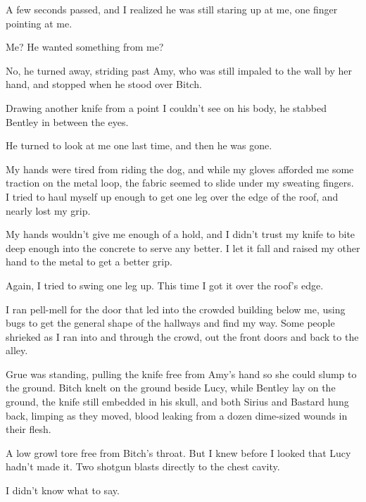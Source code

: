 A few seconds passed, and I realized he was still staring up at me, one finger pointing at me.



Me?  He wanted something from me?



No, he turned away, striding past Amy, who was still impaled to the wall by her hand, and stopped when he stood over Bitch.



Drawing another knife from a point I couldn't see on his body, he stabbed Bentley in between the eyes.



He turned to look at me one last time, and then he was gone.



My hands were tired from riding the dog, and while my gloves afforded me some traction on the metal loop, the fabric seemed to slide under my sweating fingers.  I tried to haul myself up enough to get one leg over the edge of the roof, and nearly lost my grip.



My hands wouldn't give me enough of a hold, and I didn't trust my knife to bite deep enough into the concrete to serve any better.  I let it fall and raised my other hand to the metal to get a better grip.



Again, I tried to swing one leg up.  This time I got it over the roof's edge.



I ran pell-mell for the door that led into the crowded building below me, using bugs to get the general shape of the hallways and find my way.  Some people shrieked as I ran into and through the crowd, out the front doors and back to the alley.



Grue was standing, pulling the knife free from Amy's hand so she could slump to the ground.  Bitch knelt on the ground beside Lucy, while Bentley lay on the ground, the knife still embedded in his skull, and both Sirius and Bastard hung back, limping as they moved, blood leaking from a dozen dime-sized wounds in their flesh.



A low growl tore free from Bitch's throat.  But I knew before I looked that Lucy hadn't made it.  Two shotgun blasts directly to the chest cavity.



I didn't know what to say.



